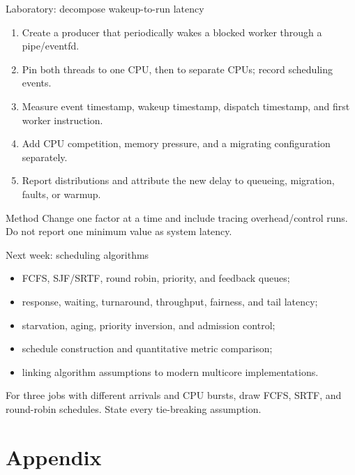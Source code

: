 \documentclass[aspectratio=169,11pt]{beamer}
\begin{document}
\begin{frame}{Laboratory: decompose wakeup-to-run latency}
  \begin{enumerate}
    \item Create a producer that periodically wakes a blocked worker through a pipe/eventfd.
    \item Pin both threads to one CPU, then to separate CPUs; record scheduling events.
    \item Measure event timestamp, wakeup timestamp, dispatch timestamp, and first worker instruction.
    \item Add CPU competition, memory pressure, and a migrating configuration separately.
    \item Report distributions and attribute the new delay to queueing, migration, faults, or warmup.
  \end{enumerate}
  \begin{alertblock}{Method}
    Change one factor at a time and include tracing overhead/control runs. Do not report one minimum value as system latency.
  \end{alertblock}
\end{frame}

\begin{frame}{Next week: scheduling algorithms}
  \begin{itemize}
    \item FCFS, SJF/SRTF, round robin, priority, and feedback queues;
    \item response, waiting, turnaround, throughput, fairness, and tail latency;
    \item starvation, aging, priority inversion, and admission control;
    \item schedule construction and quantitative metric comparison;
    \item linking algorithm assumptions to modern multicore implementations.
  \end{itemize}
  \begin{tcolorbox}[title=Preparation]
    For three jobs with different arrivals and CPU bursts, draw FCFS, SRTF, and round-robin schedules. State every tie-breaking assumption.
  \end{tcolorbox}
\end{frame}

\appendix
\section{Appendix}
\end{document}
